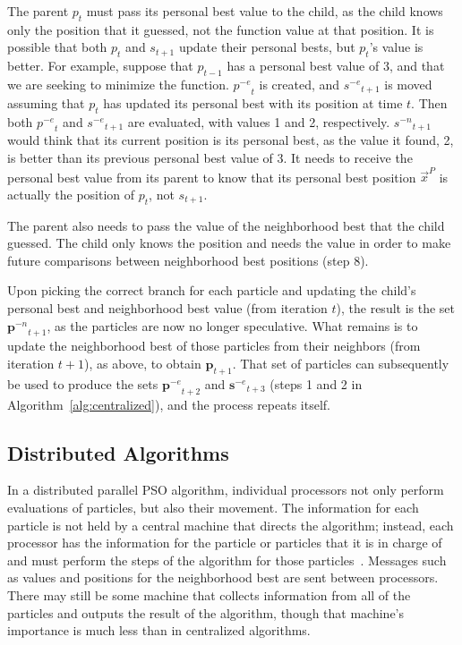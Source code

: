 \documentclass[smallcondensed]{svjour3}
\newcommand{\alg}[1]{Algorithm~\ref{alg:#1}}
\providecommand{\pers}{\ensuremath{P}}
\providecommand{\pbest}{\ensuremath{\Vec{x}^\pers}}
\providecommand{\noeval}[1]{\ensuremath{#1^{-e}}}
\providecommand{\nonbest}[1]{\ensuremath{#1^{-n}}}
\providecommand{\p}{\ensuremath{p}}
\providecommand{\pset}{\ensuremath{\mathbf{p}}}
\providecommand{\s}{\ensuremath{s}}
\providecommand{\sset}{\ensuremath{\mathbf{s}}}
\begin{document}
The parent $\p_t$ must pass its personal best value to the child, as the child
knows only the position that it guessed, not the function value at that
position.  It is possible that both $\p_t$ and $\s_{t+1}$ update their personal
bests, but $\p_t$'s value is better.  For example, suppose that $\p_{t-1}$ has
a personal best value of 3, and that we are seeking to minimize the function.
$\noeval{\p}_t$ is created, and $\noeval{\s}_{t+1}$ is moved assuming that
$\p_t$ has updated its personal best with its position at time $t$.  Then both
$\noeval{\p}_t$ and $\noeval{\s}_{t+1}$ are evaluated, with values 1 and 2,
respectively.  $\nonbest{\s}_{t+1}$ would think that its current position is
its personal best, as the value it found, 2, is better than its previous
personal best value of 3.  It needs to receive the personal best value from its
parent to know that its personal best position $\pbest$ is actually the
position of $\p_t$, not $\s_{t+1}$.

The parent also needs to pass the value of the neighborhood best that the child
guessed.  The child only knows the position and needs the value in order to
make future comparisons between neighborhood best positions (step 8).

Upon picking the correct branch for each particle and updating the child's
personal best and neighborhood best value (from iteration $t$), the result is
the set $\nonbest{\pset}_{t+1}$, as the particles are now no longer
speculative.  What remains is to update the neighborhood best of those
particles from their neighbors (from iteration $t+1$), as above, to obtain
$\pset_{t+1}$.  That set of particles can subsequently be used to produce the
sets $\noeval{\pset}_{t+2}$ and $\noeval{\sset}_{t+3}$ (steps 1 and 2 in
\alg{centralized}), and the process repeats itself.

\subsection{Distributed Algorithms}

\label{sec:distributed}

In a distributed parallel PSO algorithm, individual processors not only perform
evaluations of particles, but also their movement.  The information for each
particle is not held by a central machine that directs the algorithm; instead,
each processor has the information for the particle or particles that it is in
charge of and must perform the steps of the algorithm for those
particles~\citep{mcnabb-2007-parallel-pso-using-mapreduce}.  Messages such as
values and positions for the neighborhood best are sent between processors.
There may still be some machine that collects information from all of the
particles and outputs the result of the algorithm, though that machine's
importance is much less than in centralized algorithms.
\end{document}
